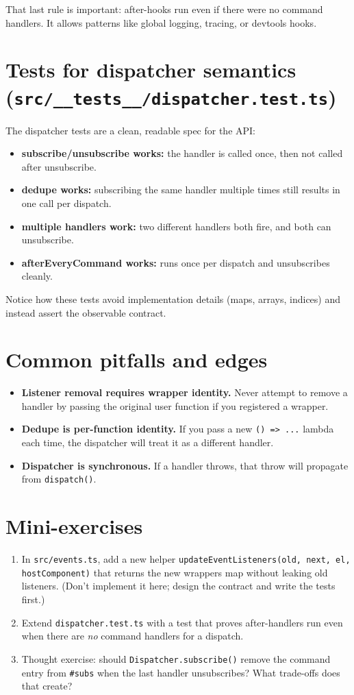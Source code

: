 That last rule is important: after-hooks run even if there were no command handlers.
It allows patterns like global logging, tracing, or devtools hooks.

\section{Tests for dispatcher semantics (\texttt{src/\_\_tests\_\_/dispatcher.test.ts})}
The dispatcher tests are a clean, readable spec for the API:

\begin{itemize}
  \item \textbf{subscribe/unsubscribe works:} the handler is called once, then not called after unsubscribe.
  \item \textbf{dedupe works:} subscribing the same handler multiple times still results in one call per dispatch.
  \item \textbf{multiple handlers work:} two different handlers both fire, and both can unsubscribe.
  \item \textbf{afterEveryCommand works:} runs once per dispatch and unsubscribes cleanly.
\end{itemize}

Notice how these tests avoid implementation details (maps, arrays, indices) and instead assert the observable contract.

\section{Common pitfalls and edges}
\begin{itemize}
  \item \textbf{Listener removal requires wrapper identity.} Never attempt to remove a handler by passing the original user function if you registered a wrapper.
  \item \textbf{Dedupe is per-function identity.} If you pass a new \texttt{() => ...} lambda each time, the dispatcher will treat it as a different handler.
  \item \textbf{Dispatcher is synchronous.} If a handler throws, that throw will propagate from \texttt{dispatch()}.
\end{itemize}

\section{Mini-exercises}
\begin{enumerate}
  \item In \texttt{src/events.ts}, add a new helper \texttt{updateEventListeners(old, next, el, hostComponent)} that returns the new wrappers map without leaking old listeners. (Don't implement it here; design the contract and write the tests first.)
  \item Extend \texttt{dispatcher.test.ts} with a test that proves after-handlers run even when there are \emph{no} command handlers for a dispatch.
  \item Thought exercise: should \texttt{Dispatcher.subscribe()} remove the command entry from \texttt{\#subs} when the last handler unsubscribes? What trade-offs does that create?
\end{enumerate}

